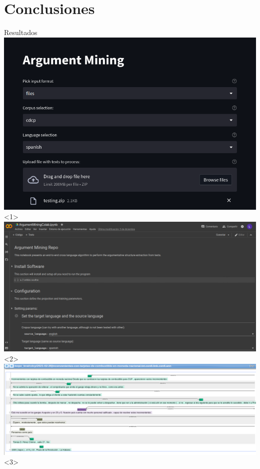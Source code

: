 \documentclass{beamer}
\begin{document}
\section{Conclusiones}

\begin{frame}{Resultados}
    \includegraphics[keepaspectratio=true,height=\textheight,width=\textwidth]{Graphics/streamlit_app.png}<1>
    \includegraphics[keepaspectratio=true,height=\textheight,width=\textwidth]{Graphics/colab.png}<2>
    \includegraphics[keepaspectratio=true,height=\textheight,width=\textwidth]{Graphics/brat_cdcp_example.png}<3>
\end{frame}
\end{document}
